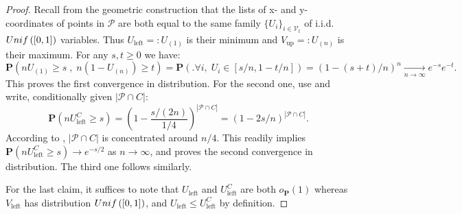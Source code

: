 \documentclass{article}
\theoremstyle{remark}
\newcommand{\cv}[2]{\underset{#1\to#2}{\longrightarrow}}
\newcommand{\card}[1]{\left|#1\right|}
\def\P{\mathbf{P}}
\newcommand{\prob}[1]{\mathbf{P}\left(#1\right)}
\newcommand{\Unif}[1]{{\rm Unif}\left(#1\right)}
\def\pts{\mathcal{P}}
\def\Vert{\mathcal{V}}
\begin{document}
\begin{proof}
    Recall from the geometric construction that the lists of x- and y-coordinates of points in $\pts$ are both equal to the same family $\{U_i\}_{i\in\Vert_t}$ of i.i.d.~$\Unif{[0,1]}$ variables.
    Thus $U_\text{left} =: U_{(1)}$ is their minimum and $V_\text{up} =: U_{(n)}$ is their maximum.
    For any $s,t\ge0$ we have:
    \begin{equation*}
        \prob{nU_{(1)} \ge s \;,\; n\left(1-U_{(n)}\right) \ge t}
        = \prob{\big. \forall i,\; U_i\in[s/n,1-t/n]}
        = (1-(s+t)/n)^n
        \cv{n}{\infty} e^{-s}e^{-t} .
    \end{equation*}
    This proves the first convergence in distribution.
    For the second one, use  and write, conditionally given $\card{\pts\cap C}$:
    \begin{equation*}
        \prob{nU_\text{left}^C \ge s}
        = \left( 1 - \frac{s/(2n)}{1/4} \right)^{\card{\pts\cap C}}
        = ( 1 - 2s/n )^{\card{\pts\cap C}} .
    \end{equation*}
    According to , $\card{\pts\cap C}$ is concentrated around $n/4$.
    This readily implies $\prob{nU_\text{left}^C \ge s} \to e^{-s/2}$ as $n\to\infty$, and proves the second convergence in distribution.
    The third one follows similarly.
    
    For the last claim, it suffices to note that $U_\text{left}$ and $U_\text{left}^C$ are both $o_\P(1)$ whereas $V_\text{left}$ has distribution $\Unif{[0,1]}$, and $U_\text{left} \le U_\text{left}^C$ by definition.
\end{proof}
\end{document}
